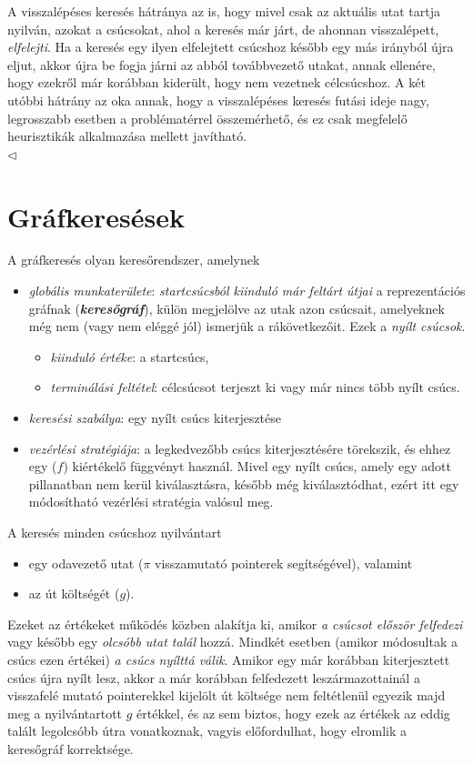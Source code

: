 \documentclass[12pt,margin=0px]{article}
\begin{document}
{    \noindent A visszalépéses keresés hátránya az is, hogy mivel csak az aktuális utat tartja nyilván, azokat a csúcsokat, ahol a keresés már járt, de ahonnan visszalépett, \emph{elfelejti}. Ha a keresés egy ilyen elfelejtett csúcshoz később egy más irányból újra eljut, akkor újra be fogja járni az abból továbbvezető utakat, annak ellenére, hogy ezekről már korábban kiderült, hogy nem vezetnek célcsúcshoz. A két utóbbi hátrány az oka annak, hogy a visszalépéses keresés futási ideje nagy, legrosszabb esetben a problématérrel összemérhető, és ez csak megfelelő heurisztikák alkalmazása mellett javítható.\\
    $\triangleleft$ \faLightbulbO}

	\section*{Gráfkeresések}
	
    \noindent A gráfkeresés olyan keresőrendszer, amelynek
    \begin{itemize}
     \item \emph{globális munkaterülete}: \emph{startcsúcsból kiinduló már feltárt útjai} a reprezentációs gráfnak (\textbf{\emph{keresőgráf}}), külön megjelölve az utak azon csúcsait, amelyeknek még nem (vagy nem eléggé jól) ismerjük a rákövetkezőit. Ezek a \textit{nyílt csúcsok}.
     \begin{itemize}
        \item \emph{kiinduló értéke}: a startcsúcs,
        \item \emph{terminálási feltétel}: célcsúcsot terjeszt ki vagy már nincs több nyílt csúcs.
     \end{itemize}
     \item \emph{keresési szabálya}: egy nyílt csúcs kiterjesztése
     \item \emph{vezérlési stratégiája}: a legkedvezőbb csúcs kiterjesztésére törekszik, és ehhez egy ($f$) kiértékelő függvényt használ. Mivel egy nyílt csúcs, amely egy adott pillanatban nem kerül kiválasztásra, később még kiválasztódhat, ezért itt egy módosítható vezérlési stratégia valósul meg.
    \end{itemize}
	
	\noindent A keresés minden csúcshoz nyilvántart
    \begin{itemize}
        \item egy odavezető utat {\small (\textbf{$\pi$} visszamutató pointerek segítségével)}, valamint
        \item az út költségét ($g$).
    \end{itemize}
    \noindent Ezeket az értékeket működés közben alakítja ki, amikor \emph{a csúcsot először felfedezi} vagy később egy \emph{olcsóbb utat talál} hozzá. Mindkét esetben (amikor módosultak a csúcs ezen értékei) \emph{a csúcs nyílttá válik}. Amikor egy már korábban kiterjesztett csúcs újra nyílt lesz, akkor a már korábban felfedezett leszármazottainál a visszafelé mutató pointerekkel kijelölt út költsége nem feltétlenül egyezik majd meg a nyilvántartott $g$ értékkel, és az sem biztos, hogy ezek az értékek az eddig talált legolcsóbb útra vonatkoznak, vagyis előfordulhat, hogy elromlik a keresőgráf korrektsége.
\end{document}
